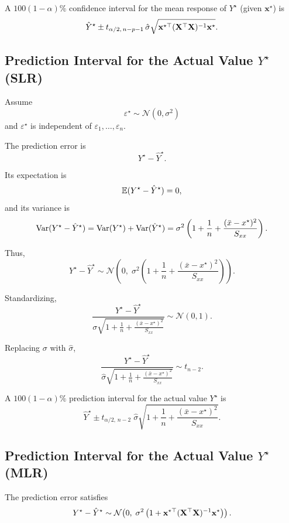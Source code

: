 \begin{keyresult}
A $100(1-\alpha)\%$ confidence interval for the mean response of $Y^\star$ (given $\mathbf{x}^\star$) is
\[
\hat{Y}^\star
\pm
t_{\alpha/2,\,n-p-1}\,
\hat{\sigma}
\sqrt{
\mathbf{x}^{\star\top}(\mathbf{X}^\top\mathbf{X})^{-1}\mathbf{x}^\star
}.
\]
\end{keyresult}

\subsection{Prediction Interval for the Actual Value $Y^\star$ (SLR)}

Assume
\[
\varepsilon^\star \sim \mathcal{N}(0,\sigma^2)
\]
and $\varepsilon^\star$ is independent of $\varepsilon_1,\dots,\varepsilon_n$.

The prediction error is
\[
Y^\star - \hat{Y}^\star.
\]

Its expectation is
\[
\mathbb{E}(Y^\star - \hat{Y}^\star) = 0,
\]
and its variance is
\[
\operatorname{Var}(Y^\star - \hat{Y}^\star)
= \operatorname{Var}(Y^\star) +\operatorname{Var}(\hat{Y}^\star) =
\sigma^2
\left(
1 + \frac{1}{n} + \frac{(\bar{x}-x^\star)^2}{S_{xx}}
\right).
\]

Thus,
\[
Y^\star - \hat{Y}^\star
\sim
\mathcal{N}\!\left(
0,
\;
\sigma^2
\left(
1 + \frac{1}{n} + \frac{(\bar{x}-x^\star)^2}{S_{xx}}
\right)
\right).
\]

Standardizing,
\[
\frac{
Y^\star - \hat{Y}^\star
}{
\sigma
\sqrt{
1 + \frac{1}{n} + \frac{(\bar{x}-x^\star)^2}{S_{xx}}
}
}
\sim
\mathcal{N}(0,1).
\]

Replacing $\sigma$ with $\hat{\sigma}$,
\[
\frac{
Y^\star - \hat{Y}^\star
}{
\hat{\sigma}
\sqrt{
1 + \frac{1}{n} + \frac{(\bar{x}-x^\star)^2}{S_{xx}}
}
}
\sim
t_{n-2}.
\]

\begin{keyresult}
A $100(1-\alpha)\%$ prediction interval for the actual value $Y^\star$ is
\[
\hat{Y}^\star
\pm
t_{\alpha/2,\,n-2}
\;
\hat{\sigma}
\sqrt{
1 + \frac{1}{n} + \frac{(\bar{x}-x^\star)^2}{S_{xx}}
}.
\]
\end{keyresult}

\subsection{Prediction Interval for the Actual Value $Y^\star$ (MLR)}

The prediction error satisfies
\[
Y^\star - \hat{Y}^\star
\sim
\mathcal{N}\!\left(
0,
\;
\sigma^2
\left(
1 +
\mathbf{x}^{\star\top}
(\mathbf{X}^\top \mathbf{X})^{-1}
\mathbf{x}^\star
\right)
\right).
\]

